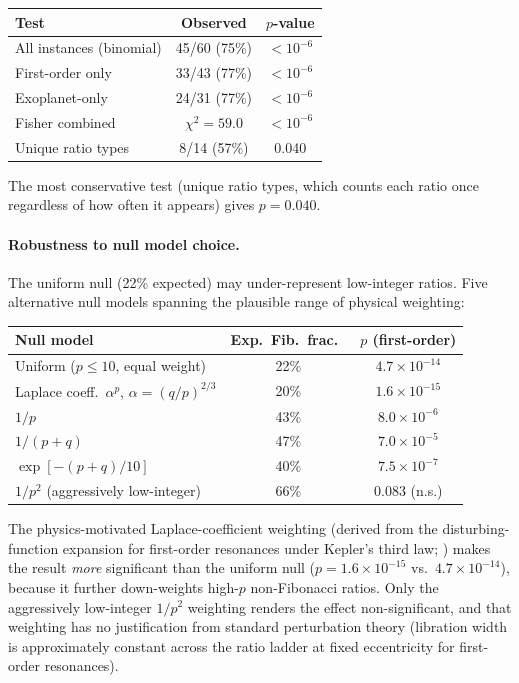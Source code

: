 \documentclass[11pt]{article}
\begin{document}
\begin{center}
\small
\begin{tabular}{lcc}
\toprule
\textbf{Test} & \textbf{Observed} & $p$-value \\
\midrule
All instances (binomial)  & 45/60 (75\%)  & $< 10^{-6}$ \\
First-order only          & 33/43 (77\%)  & $< 10^{-6}$ \\
Exoplanet-only            & 24/31 (77\%)  & $< 10^{-6}$ \\
Fisher combined           & $\chi^2 = 59.0$ & $< 10^{-6}$ \\
Unique ratio types        & 8/14 (57\%)   & 0.040 \\
\bottomrule
\end{tabular}
\end{center}

The most conservative test (unique ratio types, which counts each ratio once
regardless of how often it appears) gives $p = 0.040$.

\paragraph{Robustness to null model choice.}
The uniform null (22\% expected) may under-represent low-integer ratios.
Five alternative null models spanning the plausible range of physical weighting:

\begin{center}
\small
\begin{tabular}{lcc}
\toprule
\textbf{Null model} & Exp.\ Fib.\ frac.\ & $p$ (first-order) \\
\midrule
Uniform ($p \leq 10$, equal weight)          & 22\%  & $4.7 \times 10^{-14}$ \\
Laplace coeff.\ $\alpha^p$, $\alpha=(q/p)^{2/3}$ & 20\% & $1.6\times10^{-15}$ \\
$1/p$                                        & 43\%  & $8.0\times10^{-6}$  \\
$1/(p+q)$                                   & 47\%  & $7.0\times10^{-5}$  \\
$\exp[-(p+q)/10]$                            & 40\%  & $7.5\times10^{-7}$  \\
$1/p^2$ (aggressively low-integer)           & 66\%  & 0.083 (n.s.)         \\
\bottomrule
\end{tabular}
\end{center}

The physics-motivated Laplace-coefficient weighting (derived from the
disturbing-function expansion for first-order resonances under Kepler's
third law; \cite{murray1999,peale1976}) makes the result \emph{more}
significant than the uniform null ($p = 1.6\times10^{-15}$ vs.\ $4.7\times10^{-14}$),
because it further down-weights high-$p$ non-Fibonacci ratios.
Only the aggressively low-integer $1/p^2$ weighting renders the effect
non-significant, and that weighting has no justification from standard
perturbation theory (libration width is approximately constant
across the ratio ladder at fixed eccentricity for first-order resonances).
\end{document}
